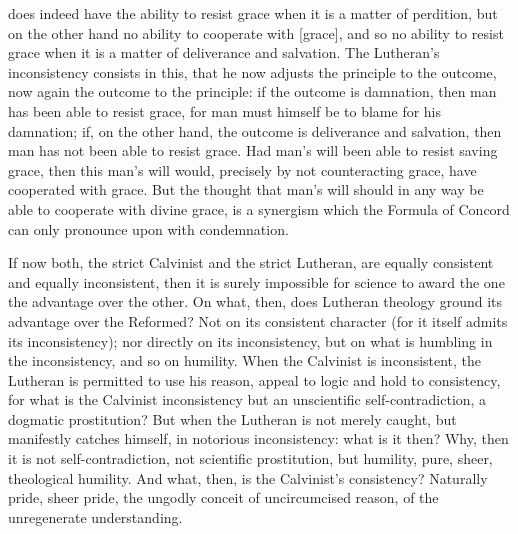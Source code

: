 \documentclass[12pt]{book}
\newcommand{\opage}[1]{\marginnote{\footnotesize\textit{[#1]}}}
\begin{document}
does indeed have the ability to resist grace when it is a matter of
perdition, but on the other hand no ability to cooperate with [grace],
and so no ability to resist grace when it is a matter of deliverance and
salvation. The Lutheran's inconsistency consists in this, that he now adjusts
the principle to the outcome, now again the outcome to the principle: if the
outcome is damnation, then man has been able to resist grace, for man must
himself be to blame for his damnation; if, on the other hand, the outcome is
deliverance and salvation, then man has not been able to resist grace. Had
man's will been able to resist saving grace, then this man's will would,
precisely by not counteracting grace, have cooperated with grace. But the
thought that man's will should in any way be able to cooperate with divine
grace,
is a synergism which the Formula of Concord can only pronounce upon with
condemnation.

If now both, the strict Calvinist and the strict Lutheran, are equally
consistent and equally inconsistent, then it is surely impossible for science
to award the one the
\opage{249}\setcounter{footnote}{0}%
advantage over the other. On what, then, does Lutheran theology ground its
advantage over the Reformed? Not on its consistent character (for it itself
admits its inconsistency); nor directly on its inconsistency, but on what is
humbling in the inconsistency, and so on humility. When the Calvinist is
inconsistent, the Lutheran is permitted to use his reason, appeal to logic and
hold to consistency, for what is the Calvinist inconsistency but an
unscientific self-contradiction, a dogmatic prostitution? But when the
Lutheran is not merely caught, but manifestly catches himself, in notorious
inconsistency: what is it then? Why, then it is not self-contradiction, not
scientific prostitution, but humility, pure, sheer, theological humility. And
what, then, is the Calvinist's consistency? Naturally pride, sheer pride, the
ungodly conceit of uncircumcised reason, of the unregenerate understanding.
\end{document}
